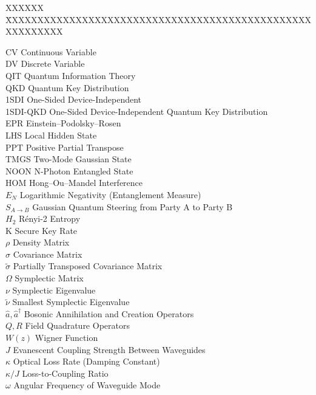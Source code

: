 \documentclass[12pt,a4paper]{report}
\begin{document}
\begin{tabbing}
	XXXXXX \= XXXXXXXXXXXXXXXXXXXXXXXXXXXXXXXXXXXXXXXXXXXXXXXXXXXXXXXXX \kill

	CV      \> Continuous Variable \\
	DV      \> Discrete Variable \\
	QIT     \> Quantum Information Theory \\
	QKD     \> Quantum Key Distribution \\
	1SDI    \> One-Sided Device-Independent \\
	1SDI-QKD \> One-Sided Device-Independent Quantum Key Distribution \\

	EPR     \> Einstein–Podolsky–Rosen \\
	LHS     \> Local Hidden State \\
	PPT     \> Positive Partial Transpose \\
	TMGS    \> Two-Mode Gaussian State \\
	NOON    \> N-Photon Entangled State \\
	HOM     \> Hong–Ou–Mandel Interference \\

	$E_N$   \> Logarithmic Negativity (Entanglement Measure) \\
	$S_{A\rightarrow B}$ \> Gaussian Quantum Steering from Party A to Party B \\
	$H_2$   \> Rényi-2 Entropy \\
	K       \> Secure Key Rate \\

	$\rho$  \> Density Matrix \\
	$\sigma$ \> Covariance Matrix \\
	$\tilde{\sigma}$ \> Partially Transposed Covariance Matrix \\
	$\Omega$ \> Symplectic Matrix \\
	$\nu$   \> Symplectic Eigenvalue \\
	$\tilde{\nu}$ \> Smallest Symplectic Eigenvalue \\

	$\hat{a}, \hat{a}^\dagger$ \> Bosonic Annihilation and Creation Operators \\
	$Q, R$  \> Field Quadrature Operators \\
	$W(z)$  \> Wigner Function \\

	$J$     \> Evanescent Coupling Strength Between Waveguides \\
	$\kappa$ \> Optical Loss Rate (Damping Constant) \\
	$\kappa/J$ \> Loss-to-Coupling Ratio \\
	$\omega$ \> Angular Frequency of Waveguide Mode \\


\end{tabbing}
\end{document}
